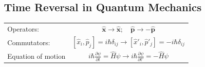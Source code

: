 \documentclass[a0,portrait]{a0poster}
\newcommand{\vect}[1]{\boldsymbol{#1}}
\begin{document}
\begin{multicols}{3}
%
%
%





\color{DarkRed}

\section*{Time Reversal in Quantum Mechanics}

\begin{center}
	\begin{xtabular}{l|c}
	\toprule
	Operators: & $ \vect{\hat{x}} \rightarrow \vect{\hat{x}}; \quad \vect{\hat{p}} \rightarrow -\vect{\hat{p}} $ \\
	Commutators: & 	$ \left[ \hat{x}_i, \hat{p}_j \right] = i \hbar \delta_{ij} \rightarrow \left[\hat{x}'_i, \hat{p}'_j \right] = - i \hbar \delta_{ij} $ \\
	Equation of motion & $ i \hbar \frac{\partial \psi}{\partial t} =  \hat{H} \psi \rightarrow i \hbar \frac{\partial \psi}{\partial t'} =  - \hat{H} \psi $ \\
	\bottomrule
	\end{xtabular}
\end{center}


\end{multicols}
\end{document}
